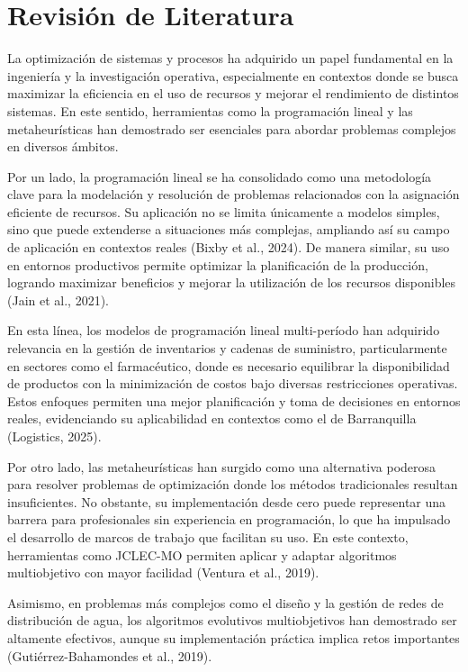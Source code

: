 \documentclass[12pt,letterpaper]{article}
\begin{document}
\section{Revisión de Literatura}

La optimización de sistemas y procesos ha adquirido un papel fundamental en la ingeniería y la investigación operativa, especialmente en contextos donde se busca maximizar la eficiencia en el uso de recursos y mejorar el rendimiento de distintos sistemas. En este sentido, herramientas como la programación lineal y las metaheurísticas han demostrado ser esenciales para abordar problemas complejos en diversos ámbitos.

Por un lado, la programación lineal se ha consolidado como una metodología clave para la modelación y resolución de problemas relacionados con la asignación eficiente de recursos. Su aplicación no se limita únicamente a modelos simples, sino que puede extenderse a situaciones más complejas, ampliando así su campo de aplicación en contextos reales (Bixby et al., 2024). De manera similar, su uso en entornos productivos permite optimizar la planificación de la producción, logrando maximizar beneficios y mejorar la utilización de los recursos disponibles (Jain et al., 2021).

En esta línea, los modelos de programación lineal multi-período han adquirido relevancia en la gestión de inventarios y cadenas de suministro, particularmente en sectores como el farmacéutico, donde es necesario equilibrar la disponibilidad de productos con la minimización de costos bajo diversas restricciones operativas. Estos enfoques permiten una mejor planificación y toma de decisiones en entornos reales, evidenciando su aplicabilidad en contextos como el de Barranquilla (Logistics, 2025).

Por otro lado, las metaheurísticas han surgido como una alternativa poderosa para resolver problemas de optimización donde los métodos tradicionales resultan insuficientes. No obstante, su implementación desde cero puede representar una barrera para profesionales sin experiencia en programación, lo que ha impulsado el desarrollo de marcos de trabajo que facilitan su uso. En este contexto, herramientas como JCLEC-MO permiten aplicar y adaptar algoritmos multiobjetivo con mayor facilidad (Ventura et al., 2019).

Asimismo, en problemas más complejos como el diseño y la gestión de redes de distribución de agua, los algoritmos evolutivos multiobjetivos han demostrado ser altamente efectivos, aunque su implementación práctica implica retos importantes (Gutiérrez-Bahamondes et al., 2019).
\end{document}
